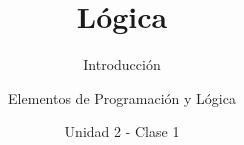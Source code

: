 \documentclass[usenames,dvipsnames]{../../common/beamerUNQ}
\title{Lógica}
\subtitle{Introducción}
\author{Elementos de Programación y Lógica}
\date{Unidad 2 - Clase 1}
\begin{document}
  \titleframe
  \toc
  
  \finaltitleframe
\end{document}
